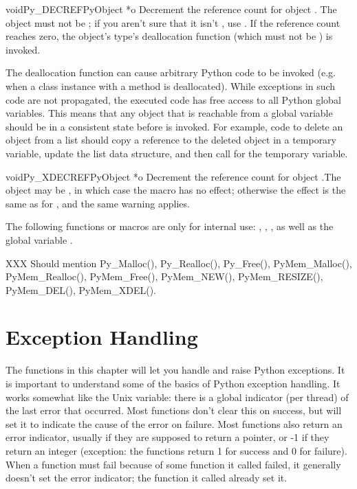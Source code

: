 \begin{cfuncdesc}{void}{Py_DECREF}{PyObject *o}
Decrement the reference count for object .  The object must
not be \NULL{}; if you aren't sure that it isn't \NULL{}, use
.  If the reference count reaches zero, the object's
type's deallocation function (which must not be \NULL{}) is invoked.

 The deallocation function can cause arbitrary Python
code to be invoked (e.g. when a class instance with a 
method is deallocated).  While exceptions in such code are not
propagated, the executed code has free access to all Python global
variables.  This means that any object that is reachable from a global
variable should be in a consistent state before  is
invoked.  For example, code to delete an object from a list should
copy a reference to the deleted object in a temporary variable, update
the list data structure, and then call  for the
temporary variable.
\end{cfuncdesc}

\begin{cfuncdesc}{void}{Py_XDECREF}{PyObject *o}
Decrement the reference count for object .The object may be
\NULL{}, in which case the macro has no effect; otherwise the
effect is the same as for , and the same warning
applies.
\end{cfuncdesc}

The following functions or macros are only for internal use:
, , ,
as well as the global variable .

XXX Should mention Py_Malloc(), Py_Realloc(), Py_Free(),
PyMem_Malloc(), PyMem_Realloc(), PyMem_Free(), PyMem_NEW(),
PyMem_RESIZE(), PyMem_DEL(), PyMem_XDEL().


\chapter{Exception Handling}

The functions in this chapter will let you handle and raise Python
exceptions.  It is important to understand some of the basics of
Python exception handling.  It works somewhat like the Unix
 variable: there is a global indicator (per thread) of the
last error that occurred.  Most functions don't clear this on success,
but will set it to indicate the cause of the error on failure.  Most
functions also return an error indicator, usually \NULL{} if they are
supposed to return a pointer, or -1 if they return an integer
(exception: the  functions return 1 for success and
0 for failure).  When a function must fail because of some function it
called failed, it generally doesn't set the error indicator; the
function it called already set it.

